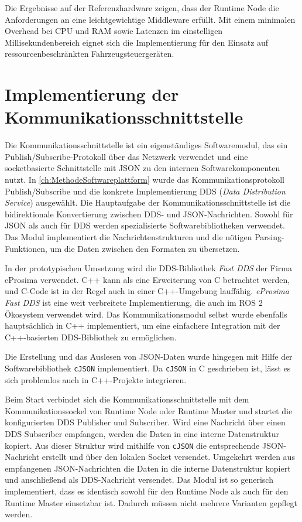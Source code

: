  Die Ergebnisse auf der Referenzhardware zeigen, dass der Runtime Node die Anforderungen an eine leichtgewichtige Middleware erfüllt. Mit einem minimalen Overhead bei CPU und RAM sowie Latenzen im einstelligen Millisekundenbereich eignet sich die Implementierung für den Einsatz auf ressourcenbeschränkten Fahrzeugsteuergeräten.

\section{Implementierung der Kommunikationsschnittstelle}
\label{sec:ImplementierungKommunikation}

Die Kommunikationsschnittstelle ist ein eigenständiges Softwaremodul, das ein Publish/Subscribe-Protokoll über das Netzwerk verwendet und eine socketbasierte Schnittstelle mit \gls{JSON} zu den internen Softwarekomponenten nutzt. In \autoref{ch:MethodeSoftwareplattform} wurde das Kommunikationsprotokoll Publish/Subscribe und die konkrete Implementierung \gls{DDS} (\textit{Data Distribution Service}) ausgewählt. Die Hauptaufgabe der Kommunikationsschnittstelle ist die bidirektionale Konvertierung zwischen \gls{DDS}- und \gls{JSON}-Nachrichten. Sowohl für \gls{JSON} als auch für \gls{DDS} werden spezialisierte Softwarebibliotheken verwendet. Das Modul implementiert die Nachrichtenstrukturen und die nötigen Parsing-Funktionen, um die Daten zwischen den Formaten zu übersetzen.

In der prototypischen Umsetzung wird die \gls{DDS}-Bibliothek \textit{Fast DDS} der Firma eProsima verwendet. C++ kann als eine Erweiterung von C betrachtet werden, und C-Code ist in der Regel auch in einer C++-Umgebung lauffähig. \textit{eProsima Fast DDS} ist eine weit verbreitete Implementierung, die auch im \gls{ROS} 2 Ökosystem verwendet wird. Das Kommunikationsmodul selbst wurde ebenfalls hauptsächlich in C++ implementiert, um eine einfachere Integration mit der C++-basierten \gls{DDS}-Bibliothek zu ermöglichen.

Die Erstellung und das Auslesen von \gls{JSON}-Daten wurde hingegen mit Hilfe der Softwarebibliothek \texttt{cJSON} implementiert. Da \texttt{cJSON} in C geschrieben ist, lässt es sich problemlos auch in C++-Projekte integrieren.

Beim Start verbindet sich die Kommunikationsschnittstelle mit dem Kommunikationssockel von Runtime Node oder Runtime Master und startet die konfigurierten DDS Publisher und Subscriber. Wird eine Nachricht über einen DDS Subscriber empfangen, werden die Daten in eine interne Datenstruktur kopiert. Aus dieser Struktur wird mithilfe von \texttt{cJSON} die entsprechende \gls{JSON}-Nachricht erstellt und über den lokalen Socket versendet. Umgekehrt werden aus empfangenen \gls{JSON}-Nachrichten die Daten in die interne Datenstruktur kopiert und anschließend als \gls{DDS}-Nachricht versendet. Das Modul ist so generisch implementiert, dass es identisch sowohl für den Runtime Node als auch für den Runtime Master einsetzbar ist. Dadurch müssen nicht mehrere Varianten gepflegt werden.

